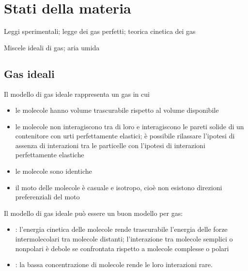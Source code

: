 \documentclass[letterpaper,10pt,italian]{jupyterBook}
\begin{document}
\sphinxstepscope


\chapter{Stati della materia}
\label{\detokenize{ch/thermodynamics/matter:stati-della-materia}}\label{\detokenize{ch/thermodynamics/matter:physics-hs-thermodynamics-matter}}\label{\detokenize{ch/thermodynamics/matter::doc}}
\sphinxAtStartPar
{} Leggi sperimentali; legge dei gas perfetti; teorica cinetica dei gas

\sphinxAtStartPar
{} Miscele ideali di gas; aria umida

\sphinxAtStartPar
{}

\sphinxstepscope


\section{Gas ideali}
\label{\detokenize{ch/thermodynamics/ideal-gas:gas-ideali}}\label{\detokenize{ch/thermodynamics/ideal-gas:physics-hs-thermodynamics-matter-gases-ideal}}\label{\detokenize{ch/thermodynamics/ideal-gas::doc}}
\sphinxAtStartPar
Il modello di gas ideale rappresenta un gas in cui
\begin{itemize}
\item {} 
\sphinxAtStartPar
le molecole hanno volume trascurabile rispetto al volume disponibile

\item {} 
\sphinxAtStartPar
le molecole non interagiscono tra di loro e interagiscono le pareti solide di un contenitore con urti perfettamente elastici; è possibile rilassare l’ipotesi di assenza di interazioni tra le particelle con l’ipotesi di interazioni perfettamente elastiche

\item {} 
\sphinxAtStartPar
le molecole sono identiche

\item {} 
\sphinxAtStartPar
il moto delle molecole è casuale e isotropo, cioè non esistono direzioni preferenziali del moto

\end{itemize}

\sphinxAtStartPar
Il modello di gas ideale può essere un buon modello per gas:
\begin{itemize}
\item {} 
\sphinxAtStartPar
{}: l’energia cinetica delle molecole rende trascurabile l’energia delle forze intermolecolari tra molecole distanti; l’interazione tra molecole semplici o non\sphinxhyphen{}polari è debole se confrontata rispetto a molecole complesse o polari

\item {} 
\sphinxAtStartPar
{}: la bassa concentrazione di molecole rende le loro interazioni rare.

\end{itemize}
\end{document}
